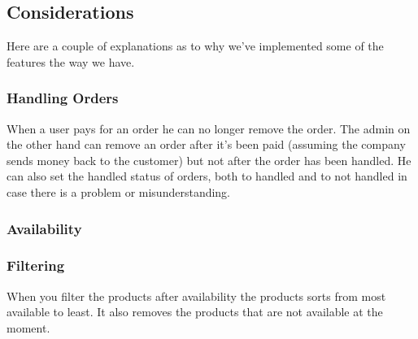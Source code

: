 \subsection{Considerations}

Here are a couple of explanations as to why we've implemented some of the features the way we have.

\subsubsection{Handling Orders}

When a user pays for an order he can no longer remove the order. The admin on the other hand can remove an order after it's been paid (assuming the company sends money back to the customer) but not after the order has been handled. He can also set the handled status of orders, both to handled and to not handled in case there is a problem or misunderstanding.

\subsubsection{Availability}

\subsubsection{Filtering}

When you filter the products after availability the products sorts from most available to least. It also removes the products that are not available at the moment.
